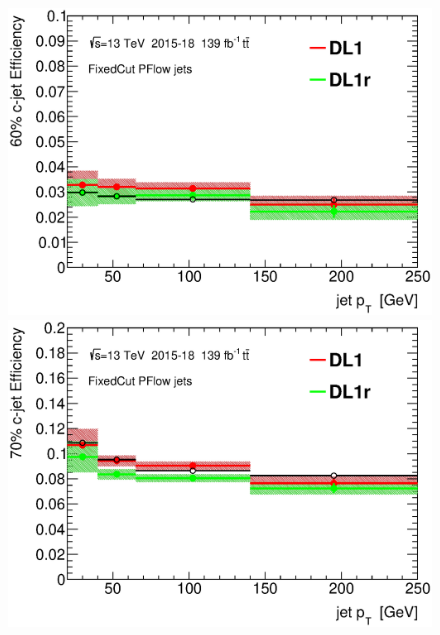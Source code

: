 \documentclass[letterpaper,12pt]{article}
\begin{document}
\begin{figure}[H]
\begin{minipage}[b]{.45\textwidth}
\centering
\includegraphics[width=1\textwidth]{SFplots_december/DL1allPFlowDec_DL1rallPFlowDec/eff60.eps}
\end{minipage}\hfill
\begin{minipage}[b]{.45\textwidth}
\centering
\includegraphics[width=1\textwidth]{SFplots_december/DL1allPFlowDec_DL1rallPFlowDec/eff70.eps}
\end{minipage}\hfill
\begin{minipage}[b]{.45\textwidth}
\centering

\end{minipage}
\end{figure}
\end{document}

